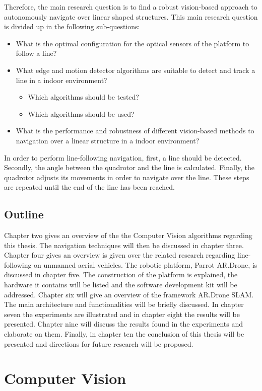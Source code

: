 \documentclass[a4paper]{article}
\begin{document}
Therefore, the main research question is to find a robust vision-based approach to autonomously navigate over linear shaped structures. This main research question is divided up in the following sub-questions:
\begin{itemize}
\item What is the optimal configuration for the optical sensors of the platform to follow a line?
\item What edge and motion detector algorithms are suitable to detect and track a line in a indoor environment?
	\begin{itemize}
	\item Which algorithms should be tested?
	\item Which algorithms should be used?
	\end{itemize}
\item What is the performance and robustness of different vision-based methods to navigation over a linear structure in a indoor environment?
\end{itemize}
In order to perform line-following navigation, first, a line should be detected. Secondly, the angle between the quadrotor and the line is calculated. Finally, the quadrotor adjusts its movements in order to navigate over the line. These steps are repeated until the end of the line has been reached.

\subsection{Outline}
Chapter two gives an overview of the the Computer Vision algorithms regarding this thesis. The navigation techniques will then be discussed in chapter three.
Chapter four gives an overview is given over the related research regarding line-following on unmanned aerial vehicles. The robotic platform, Parrot AR.Drone, is discussed in chapter five. The construction of the platform is explained, the hardware it contains will be listed and the software development kit will be addressed. Chapter six will give an overview of the framework AR.Drone SLAM. The main architecture and functionalities will be briefly discussed. In chapter seven the experiments are illustrated and in chapter eight the results will be presented. Chapter nine will discuss the results found in the experiments and elaborate on them. Finally, in chapter ten the conclusion of this thesis will be presented and directions for future research will be proposed.

\section{Computer Vision}
\end{document}
